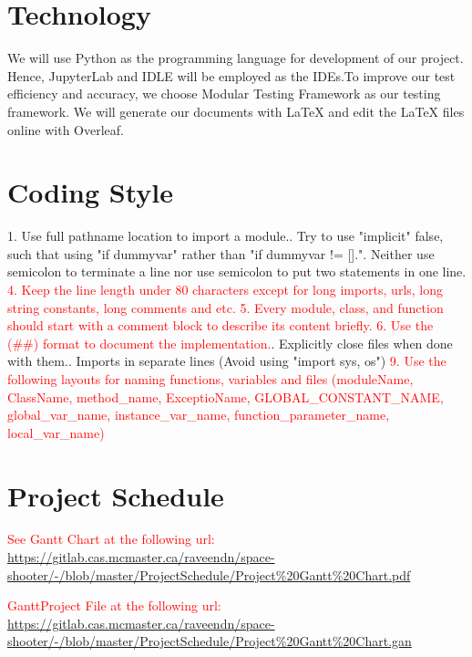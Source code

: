 \documentclass{article}
\begin{document}
\section{Technology}
    We will use Python as the programming language for development of our project. Hence, JupyterLab and IDLE will be employed as the IDEs.To improve our test efficiency and accuracy, we choose Modular Testing Framework as our testing framework. We will generate our documents with LaTeX and edit the LaTeX files online with Overleaf.  
\section{Coding Style}
1. Use full pathname location to import a module.. Try to use "implicit" false, such that using "if dummyvar" rather than "if dummyvar != [].". Neither use semicolon to terminate a line nor use semicolon to put two statements in one line. \newline
\textcolor{red}{4. Keep the line length under 80 characters except for long imports, urls, long string constants, long comments and etc.} \newline
\textcolor{red}{5. Every module, class, and function should start with a comment block to describe its content briefly.}\newline
\textcolor{red}{6. Use the (\#\#) format to document the implementation.}. Explicitly close files when done with them.. Imports in separate lines (Avoid using "import sys, os")\newline
\textcolor{red}{9. Use the following layouts for naming functions, variables and files (moduleName, ClassName, method\_name, ExceptioName, GLOBAL\_CONSTANT\_NAME, global\_var\_name, instance\_var\_name, function\_parameter\_name, local\_var\_name) }

\section{Project Schedule}

\textcolor{red}{See Gantt Chart at the following url:}
\url{https://gitlab.cas.mcmaster.ca/raveendn/space-shooter/-/blob/master/ProjectSchedule/Project%20Gantt%20Chart.pdf}

\textcolor{red}{GanttProject File at the following url:}
\url{https://gitlab.cas.mcmaster.ca/raveendn/space-shooter/-/blob/master/ProjectSchedule/Project%20Gantt%20Chart.gan}
\end{document}
